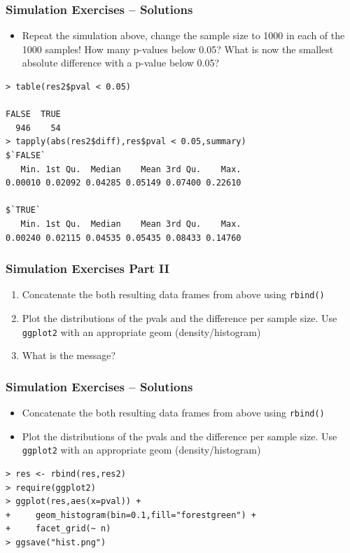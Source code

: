 \documentclass[xcolor={table}]{beamer}
\begin{document}
\begin{frame}[fragile]\frametitle{Simulation Exercises -- Solutions} 
\begin{itemize}
\item Repeat the simulation above, change the sample size to 1000 in each of the 1000 samples! How many p-values below 0.05? What is now the smallest absolute difference with a p-value below 0.05?
\end{itemize}\small
\begin{verbatim}
> table(res2$pval < 0.05)

FALSE  TRUE 
  946    54 
> tapply(abs(res2$diff),res$pval < 0.05,summary)
$`FALSE`
   Min. 1st Qu.  Median    Mean 3rd Qu.    Max. 
0.00010 0.02092 0.04285 0.05149 0.07400 0.22610 

$`TRUE`
   Min. 1st Qu.  Median    Mean 3rd Qu.    Max. 
0.00240 0.02115 0.04535 0.05435 0.08433 0.14760 
\end{verbatim}
\end{frame}

\begin{frame}\frametitle{Simulation Exercises Part II} 
  \begin{enumerate}
  \item Concatenate the both resulting data frames from above using \texttt{rbind()}
  \item Plot the distributions of the pvals and the difference per sample size. Use \texttt{ggplot2} with an appropriate geom (density/histogram)
  \item What is the message?
  \end{enumerate}
\end{frame}

\begin{frame}[fragile]\frametitle{Simulation Exercises -- Solutions} 
\begin{itemize}
\item Concatenate the both resulting data frames from above using \texttt{rbind()}
\item Plot the distributions of the pvals and the difference per sample size. Use \texttt{ggplot2} with an appropriate geom (density/histogram)
\end{itemize}\small
\begin{verbatim}
> res <- rbind(res,res2)  
> require(ggplot2)
> ggplot(res,aes(x=pval)) +
+     geom_histogram(bin=0.1,fill="forestgreen") +
+     facet_grid(~ n)
> ggsave("hist.png")
\end{verbatim}
\end{frame}
\end{document}
